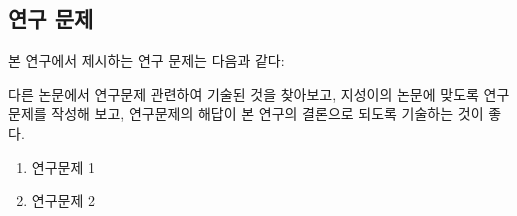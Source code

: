 \subsection{연구 문제}

본 연구에서 제시하는 연구 문제는 다음과 같다:

다른 논문에서 연구문제 관련하여 기술된 것을 찾아보고, 지성이의 논문에 맞도록 연구문제를 작성해 보고, 
연구문제의 해답이 본 연구의 결론으로 되도록 기술하는 것이 좋다.

\begin{enumerate}
	
	\item 연구문제 1
	\item 연구문제 2
	
\end{enumerate}


